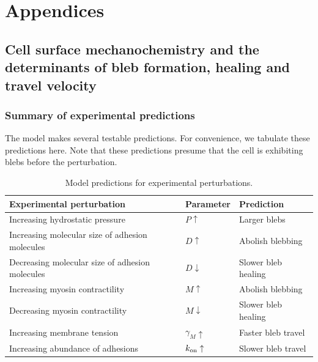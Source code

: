 
\appendix
\chapter{Appendices}


\section{Cell surface mechanochemistry and the determinants of bleb formation, healing and travel velocity}
\label{sec:project1}

\subsection{Summary of experimental predictions}
The model makes several testable predictions. For convenience, we tabulate these predictions here. Note that these predictions presume that the cell is exhibiting blebs before the perturbation.

\begin{table}[h!]
\caption{Model predictions for experimental perturbations.\vspace{0.1cm}} \label{tab:predictions} 
{\small
\hspace{-0.25cm}\begin{tabular}{ l  l  l}
\hline
Experimental perturbation & Parameter & Prediction \\
\hline
Increasing hydrostatic pressure & $P\uparrow$ & Larger blebs \\
Increasing molecular size of adhesion molecules & $D\uparrow$ & Abolish blebbing\\
Decreasing molecular size of adhesion molecules & $D\downarrow$ & Slower bleb healing\\
Increasing myosin contractility & $M\uparrow$ & Abolish blebbing\\
Decreasing myosin contractility  & $M\downarrow$ & Slower bleb healing\\
Increasing membrane tension &$\gamma_M\uparrow$ & Faster bleb travel\\
Increasing abundance of adhesions &$k_{\mbox{\scriptsize on}}\uparrow$ & Slower bleb travel\\
\hline
\end{tabular}
}
\end{table}

